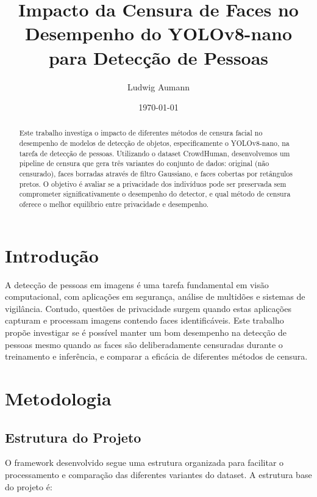 \documentclass[12pt,a4paper]{article}
\title{Impacto da Censura de Faces no Desempenho do YOLOv8-nano para Detecção de Pessoas}
\author{Ludwig Aumann}
\date{\today}
\begin{document}
\maketitle

\begin{abstract}
Este trabalho investiga o impacto de diferentes métodos de censura facial no desempenho de modelos de detecção de objetos, especificamente o YOLOv8-nano, na tarefa de detecção de pessoas. Utilizando o dataset CrowdHuman, desenvolvemos um pipeline de censura que gera três variantes do conjunto de dados: original (não censurado), faces borradas através de filtro Gaussiano, e faces cobertas por retângulos pretos. O objetivo é avaliar se a privacidade dos indivíduos pode ser preservada sem comprometer significativamente o desempenho do detector, e qual método de censura oferece o melhor equilíbrio entre privacidade e desempenho.
\end{abstract}

\section{Introdução}
A detecção de pessoas em imagens é uma tarefa fundamental em visão computacional, com aplicações em segurança, análise de multidões e sistemas de vigilância. Contudo, questões de privacidade surgem quando estas aplicações capturam e processam imagens contendo faces identificáveis. Este trabalho propõe investigar se é possível manter um bom desempenho na detecção de pessoas mesmo quando as faces são deliberadamente censuradas durante o treinamento e inferência, e comparar a eficácia de diferentes métodos de censura.

\section{Metodologia}

\subsection{Estrutura do Projeto}
O framework desenvolvido segue uma estrutura organizada para facilitar o processamento e comparação das diferentes variantes do dataset. A estrutura base do projeto é:
\end{document}
